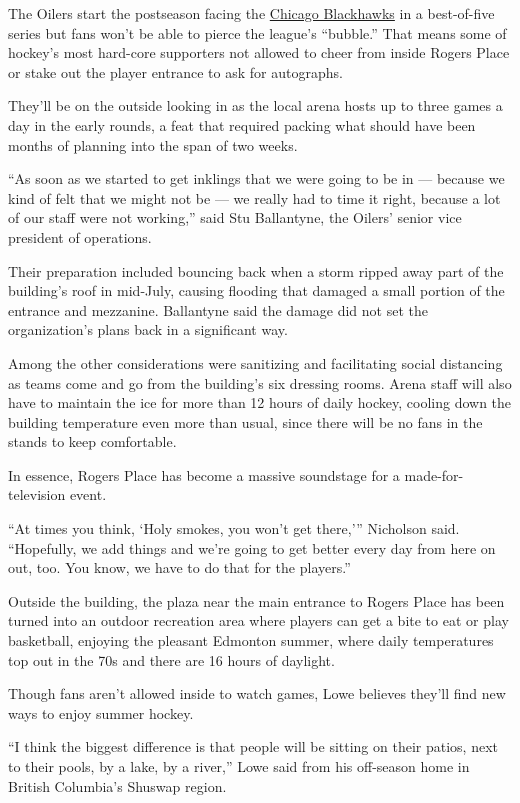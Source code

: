 The Oilers start the postseason facing the
\href{https://www.nytimes3xbfgragh.onion/2020/07/07/sports/hockey/chicago-blackhawks-stand-by-logo.html}{Chicago
Blackhawks} in a best-of-five series but fans won't be able to pierce
the league's ``bubble.'' That means some of hockey's most hard-core
supporters not allowed to cheer from inside Rogers Place or stake out
the player entrance to ask for autographs.

They'll be on the outside looking in as the local arena hosts up to
three games a day in the early rounds, a feat that required packing what
should have been months of planning into the span of two weeks.

``As soon as we started to get inklings that we were going to be in ---
because we kind of felt that we might not be --- we really had to time
it right, because a lot of our staff were not working,'' said Stu
Ballantyne, the Oilers' senior vice president of operations.

Their preparation included bouncing back when a storm ripped away part
of the building's roof in mid-July, causing flooding that damaged a
small portion of the entrance and mezzanine. Ballantyne said the damage
did not set the organization's plans back in a significant way.

Among the other considerations were sanitizing and facilitating social
distancing as teams come and go from the building's six dressing rooms.
Arena staff will also have to maintain the ice for more than 12 hours of
daily hockey, cooling down the building temperature even more than
usual, since there will be no fans in the stands to keep comfortable.

In essence, Rogers Place has become a massive soundstage for a
made-for-television event.

``At times you think, `Holy smokes, you won't get there,''' Nicholson
said. ``Hopefully, we add things and we're going to get better every day
from here on out, too. You know, we have to do that for the players.''

Outside the building, the plaza near the main entrance to Rogers Place
has been turned into an outdoor recreation area where players can get a
bite to eat or play basketball, enjoying the pleasant Edmonton summer,
where daily temperatures top out in the 70s and there are 16 hours of
daylight.

Though fans aren't allowed inside to watch games, Lowe believes they'll
find new ways to enjoy summer hockey.

``I think the biggest difference is that people will be sitting on their
patios, next to their pools, by a lake, by a river,'' Lowe said from his
off-season home in British Columbia's Shuswap region.

